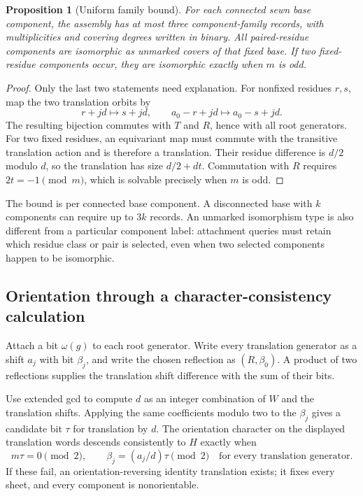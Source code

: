 \documentclass[11pt,a4paper]{article}
\newtheorem{proposition}[theorem]{Proposition}
\theoremstyle{definition}\newtheorem{definition}[theorem]{Definition}
\theoremstyle{remark}\newtheorem{remark}[theorem]{Remark}
\begin{document}
\begin{proposition}[Uniform family bound]\label{prop:families}
For each connected sewn base component, the assembly has at most three
component-family records, with multiplicities and covering degrees written
in binary. All paired-residue components are isomorphic as unmarked covers
of that fixed base. If two fixed-residue components occur, they are
isomorphic exactly when $m$ is odd.
\end{proposition}
\begin{proof}
Only the last two statements need explanation. For nonfixed residues $r,s$,
map the two translation orbits by
\[
 r+jd\mapsto s+jd,\qquad
 a_0-r+jd\mapsto a_0-s+jd.
\]
The resulting bijection commutes with $T$ and $R$, hence with all root
generators. For two fixed residues, an equivariant map must commute with the
transitive translation action and is therefore a translation. Their residue
difference is $d/2$ modulo $d$, so the translation has size $d/2+dt$.
Commutation with $R$ requires $2t=-1\pmod m$, which is solvable precisely
when $m$ is odd.
\end{proof}

The bound is per connected base component. A disconnected base with $k$
components can require up to $3k$ records. An unmarked isomorphism type is
also different from a particular component label: attachment queries must
retain which residue class or pair is selected, even when two selected
components happen to be isomorphic.

\subsection{Orientation through a character-consistency calculation}

Attach a bit $\omega(g)$ to each root generator. Write every translation
generator as a shift $a_j$ with bit $\beta_j$, and write the chosen
reflection as $(R,\beta_0)$. A product of two reflections supplies the
translation shift difference with the sum of their bits.

Use extended gcd to compute $d$ as an integer combination of $W$ and the
translation shifts. Applying the same coefficients modulo two to the
$\beta_j$ gives a candidate bit $\tau$ for translation by $d$. The orientation
character on the displayed translation words descends consistently to
$H$ exactly when
\begin{equation}\label{eq:consistency}
 m\tau=0\pmod2,\qquad
 \beta_j=(a_j/d)\tau\pmod2\quad\text{for every translation generator.}
\end{equation}
If these fail, an orientation-reversing identity translation exists; it
fixes every sheet, and every component is nonorientable.
\end{document}
